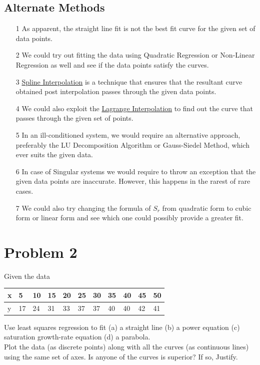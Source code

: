 \documentclass[titlepage, 11pt]{article}
\begin{document}
\subsection{Alternate Methods}
\begin{itemize}
    \item [1] As apparent, the straight line fit is not the best fit curve for the given set of data points.
    \item [2] We could try out fitting the data using Quadratic Regression or Non-Linear Regression as well and see if the data points satisfy the curves.
    \item [3] \href{https://en.wikipedia.org/wiki/Spline_interpolation}{Spline Interpolation} is a technique that ensures that the resultant curve obtained post interpolation passes through the given data points.
    \item [4] We could also exploit the \href{https://en.wikipedia.org/wiki/Lagrange_polynomial}{Lagrange Interpolation} to find out the curve that passes through the given set of points.
    \item [5] In an ill-conditioned system, we would require an alternative approach, preferably the LU Decomposition Algorithm or Gauss-Siedel Method, which ever suits the given data. 
    \item [6] In case of Singular systems we would require to throw an exception that the given data points are inaccurate. However, this happens in the rarest of rare cases.
    \item [7] We could also try changing the formula of $S_r$ from quadratic form to cubic form or linear form and see which one could possibly provide a greater fit.
\end{itemize}


% 
% 
\newpage
\section{Problem 2}
Given the data
\begin{table}[h!]
\begin{center}
    \label{tab:table1}
    \begin{tabular}{l |l l l l l l l l l l }
      x & 5 & 10 & 15 & 20 & 25 & 30 & 35 & 40 & 45 & 50\\
      \hline
      y & 17 & 24 & 31 & 33 & 37 & 37 & 40 & 40 & 42 & 41\\
     
    \end{tabular}
\end{center}
\end{table} 
Use least squares regression to fit (a) a straight line (b) a power equation (c) saturation growth-rate equation (d) a parabola.\\
 Plot the data (as discrete points) along with all the curves (as continuous lines) using the same set of axes. Is anyone of the curves is superior? If so, Justify.
\end{document}
